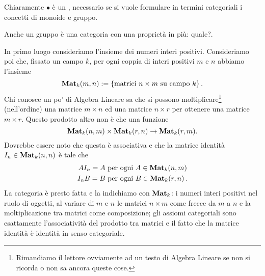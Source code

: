 \begin{nota}
Chiaramente \(\bullet\) è un , necessario se si vuole formulare in termini categoriali i concetti di monoide e gruppo.
\end{nota}

\begin{esercizio}
Anche un gruppo è una categoria con una proprietà in più: quale?.
\end{esercizio}

\begin{esempio}\label{esempio:MatsFormsACat}
In primo luogo consideriamo l'insieme dei numeri interi positivi. Consideriamo poi che, fissato un campo \(k\), per ogni coppia di interi positivi \(m\) e \(n\) abbiamo l'insieme
\[\mathbf{Mat}_k(m,n) := \left\{\text{matrici \(n \times m\) su campo \(k\)}\right\} .\]
Chi conosce un po' di Algebra Lineare sa che si possono moltiplicare\footnote{Rimandiamo il lettore ovviamente ad un testo di Algebra Lineare se non si ricorda o non sa ancora queste cose.} (nell'ordine) una matrice \(m \times n\) ed una matrice \(n \times r\) per ottenere una matrice \(m \times r\). Questo prodotto altro non è che una funzione
\[\mathbf{Mat}_k(n,m) \times \mathbf{Mat}_k(r,n) \to \mathbf{Mat}_k(r,m) .\]
Dovrebbe essere noto che questa è associativa e che la matrice identità \(I_n \in \mathbf{Mat}_k(n,n)\) è tale che 
\begin{align*}
A I_n = A &\text{ per ogni } A \in \mathbf{Mat}_k(n,m) \\
I_n B = B &\text{ per ogni } B \in \mathbf{Mat}_k(r,n)\,.
\end{align*}
La categoria è presto fatta e la indichiamo con \(\mathbf{Mat}_k\): i numeri interi positivi nel ruolo di oggetti, al variare di \(m\) e \(n\) le matrici \(n \times m\) come frecce da \(m\) a \(n\) e la moltiplicazione tra matrici come composizione; gli assiomi categoriali sono esattamente l'associatività del prodotto tra matrici e il fatto che la matrice identità è identità in senso categoriale.
\end{esempio}

